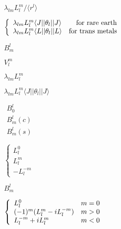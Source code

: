 \documentclass[twoside]{article}
\providecommand{\B}[1]{#1}%
\def\lthtmlcheckvsize{\ifdim\ht\sizebox<\vsize 
  \ifdim\wd\sizebox<\hsize\expandafter\hfill\fi \expandafter\vfill
  \else\expandafter\vss\fi}%
\begin{document}
{\newpage\clearpage
{}%
$ \lambda_{lm} L_l^m /\langle r^l \rangle$%
\lthtmlindisplaymathZ
\lthtmlcheckvsize\clearpage}

{\newpage\clearpage
{}%
$ \left \{ \begin{array}{lr}  \lambda_{lm} L_l^m \langle J || \theta_l || J \rangle & {\rm for~rare~earth} \\
                                                                          \lambda_{lm} L_l^m \langle L || \theta_l || L \rangle & {\rm for~trans~metals}
		                                       \end{array} \right .$%
\lthtmlindisplaymathZ
\lthtmlcheckvsize\clearpage}

{\newpage\clearpage
{}%
$B^l_m$%
\lthtmlindisplaymathZ
\lthtmlcheckvsize\clearpage}

{\newpage\clearpage
{}%
$V_l^m$%
\lthtmlindisplaymathZ
\lthtmlcheckvsize\clearpage}

{\newpage\clearpage
{}%
$ \lambda_{lm} L_l^m $%
\lthtmlindisplaymathZ
\lthtmlcheckvsize\clearpage}

{\newpage\clearpage
{}%
$ \lambda_{lm} L_l^m \langle J || \theta_l || J \rangle$%
\lthtmlindisplaymathZ
\lthtmlcheckvsize\clearpage}

{\newpage\clearpage
{}%
$\begin{array}{l}B^l_0 \\B^l_m(c) \\B^l_m(s) \end{array} $%
\lthtmlindisplaymathZ
\lthtmlcheckvsize\clearpage}

{\newpage\clearpage
{}%
$\left \{ \begin{array}{l}L_l^0 \\L_l^m \\-L_l^{-m} \end{array} \right .$%
\lthtmlindisplaymathZ
\lthtmlcheckvsize\clearpage}

{\newpage\clearpage
{}%
$B_m^l$%
\lthtmlindisplaymathZ
\lthtmlcheckvsize\clearpage}

{\newpage\clearpage
{}%
$ \left \{ \begin{array}{lr} L_l^0 & m=0 \\
                                                                (-1)^m(L_l^m-iL_l^{-m}) & m >0 \\
                                                                L_l^{-m}+iL_l^{m}      &m<0    \\
\par\end{array}  \right . $%
\lthtmlindisplaymathZ
\lthtmlcheckvsize\clearpage}
\end{document}
